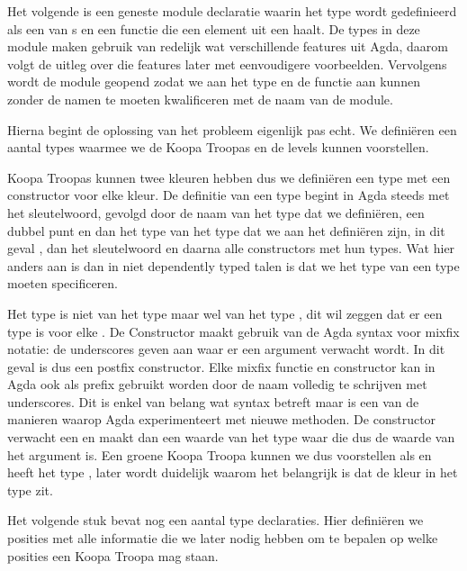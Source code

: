 Het volgende is een geneste module declaratie waarin het type 
wordt gedefinieerd als een  van s en een functie die een
element uit een  haalt. De types in deze module maken gebruik van
redelijk wat verschillende features uit Agda, daarom volgt de uitleg over die
features later met eenvoudigere voorbeelden. Vervolgens wordt de module geopend
zodat we aan het type en de functie aan kunnen zonder de namen te moeten
kwalificeren met de naam van de module.


Hierna begint de oplossing van het probleem eigenlijk pas echt. We definiëren
een aantal types waarmee we de Koopa Troopas en de levels kunnen voorstellen.


Koopa Troopas kunnen twee kleuren hebben dus we definiëren een type
 met een constructor voor elke kleur. De definitie van een type
begint in Agda steeds met het  sleutelwoord, gevolgd door de naam
van het type dat we definiëren, een dubbel punt en dan het type van het type
dat we aan het definiëren zijn, in dit geval , dan het sleutelwoord
 en daarna alle constructors met hun types. Wat hier anders aan is
dan in niet dependently typed talen is dat we het type van een type moeten
specificeren. 

Het type
 is niet van het type  maar wel van het type
, dit wil zeggen dat er een type is voor elke .
De Constructor maakt gebruik van de Agda syntax voor mixfix notatie: de
underscores geven aan waar er een argument verwacht wordt. In dit geval is
 dus een postfix constructor. Elke mixfix functie en constructor kan
in Agda ook als prefix gebruikt worden door de naam volledig te schrijven met
underscores. Dit is enkel van belang wat syntax betreft maar is een van de
manieren waarop Agda experimenteert met nieuwe methoden. De 
constructor verwacht een  en maakt dan een waarde van het type
 waar die  dus de waarde van het argument is. Een
groene Koopa Troopa kunnen we dus voorstellen als  en heeft het
type , later wordt duidelijk waarom het belangrijk is
dat de kleur in het type zit.

Het volgende stuk bevat nog een aantal type declaraties. Hier definiëren we
posities met alle informatie die we later nodig hebben om te bepalen op welke
posities een Koopa Troopa mag staan.

